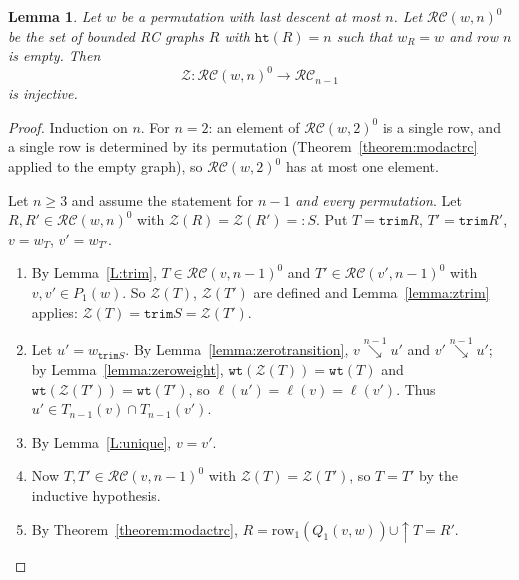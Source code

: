 \documentclass{amsart}
\newtheorem{lemma}{Lemma}[subsection]
\theoremstyle{definition}
\theoremstyle{remark}
\numberwithin{equation}{subsection}
\newcommand{\downvar}[1]{\stackrel{#1}{\searrow}}
\newcommand{\wof}[1]{w_{#1}}
\newcommand{\wtt}{\mathtt{wt}}
\newcommand{\trm}{\mathtt{trim}}
\newcommand{\zeromap}{\mathcal{Z}}
\newcommand{\hr}{\mathtt{ht}}
\newcommand{\RC}{\mathcal{RC}}
\begin{document}
\begin{lemma} \label{lemma:zero_injective}
Let $w$ be a permutation with last descent at most $n$. Let $\mathcal{RC}(w,n)^0$ be the set of bounded RC graphs $R$ with $\hr(R) = n$ such that $\wof{R}=w$ and row $n$ is empty. Then
$$\zeromap:\mathcal{RC}(w, n)^{0}\to \mathcal{RC}_{n-1}$$
is injective.
\end{lemma}
\begin{proof}
Induction on $n$. For $n=2$: an element of $\RC(w,2)^0$ is a single row, and a single row is determined by its permutation
(Theorem~\ref{theorem:modactrc} applied to the empty graph), so $\RC(w,2)^0$ has at most one element.

Let $n\ge3$ and assume the statement for $n-1$ \emph{and every permutation}. Let $R,R'\in\RC(w,n)^0$ with $\zeromap(R)=\zeromap(R')=:S$.
Put $T=\trm R$, $T'=\trm R'$, $v=\wof{T}$, $v'=\wof{T'}$.
\begin{enumerate}
\item By Lemma~\ref{L:trim}, $T\in\RC(v,n-1)^0$ and $T'\in\RC(v',n-1)^0$ with $v,v'\in P_1(w)$. So $\zeromap(T)$, $\zeromap(T')$ are defined and
Lemma~\ref{lemma:ztrim} applies: $\zeromap(T)=\trm S=\zeromap(T')$.
\item Let $u'=\wof{\trm S}$. By Lemma~\ref{lemma:zerotransition}, $v\downvar{n-1}u'$ and $v'\downvar{n-1}u'$; by Lemma~\ref{lemma:zeroweight}, $\wtt(\zeromap(T))=\wtt(T)$ and $\wtt(\zeromap(T'))=\wtt(T')$,
so $\ell(u')=\ell(v)=\ell(v')$. Thus $u'\in T_{n-1}(v)\cap T_{n-1}(v')$.
\item By Lemma~\ref{L:unique}, $v=v'$.
\item Now $T,T'\in\RC(v,n-1)^0$ with $\zeromap(T)=\zeromap(T')$, so $T=T'$ by the inductive hypothesis.
\item By Theorem~\ref{theorem:modactrc}, $R=\mathrm{row}_1(Q_1(v,w))\cup{\uparrow}T=R'$.\qedhere
\end{enumerate}
\end{proof}
\end{document}
